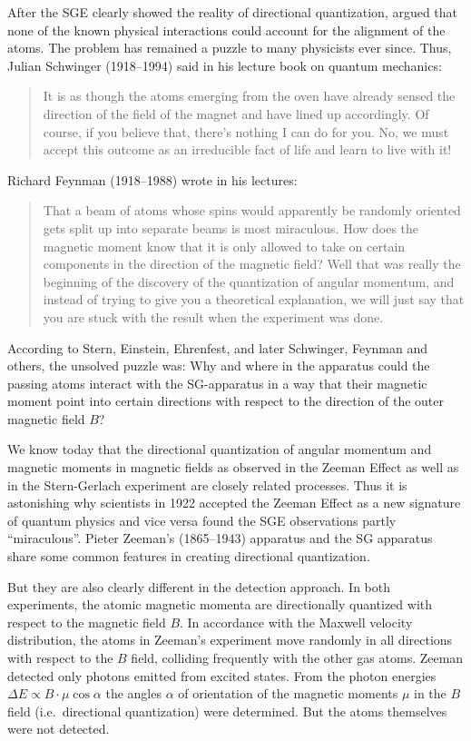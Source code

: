 \documentclass[12pt]{article}
\begin{document}
After the SGE clearly showed the reality of directional quantization, \cite{EinsteinAEtAl1922Bemerkungen} argued that none of the known physical interactions could account for the alignment of the atoms. The problem has remained a puzzle to many physicists ever since. 
Thus, Julian Schwinger (1918--1994) said in his lecture book on quantum mechanics:
\begin{quote}
It is as though the atoms emerging from the oven have already sensed the direction of the field of the magnet and have lined up accordingly. Of course, if you believe that, there's nothing I can do for you. No, we must accept this outcome as an irreducible fact of life and learn to live with it! 
\cite[p.~30]{SchwingerJ2001Mechanics}
\end{quote}
Richard Feynman (1918--1988) wrote in his lectures: 
\begin{quote}
That a beam of atoms whose spins would apparently be randomly oriented gets split up into separate beams is most miraculous. How does the magnetic moment know that it is only allowed to take on certain components in the direction of the magnetic field? Well that was really the beginning of the discovery of the quantization of angular momentum, and instead of trying to give you a theoretical explanation, we will just say that you are stuck with the result when the experiment was done.  
\cite[Vol.II, 35-2]{FeynmanR1963Lectures}
\end{quote}
According to Stern, Einstein, Ehrenfest, and later Schwinger, Feynman and others, the unsolved puzzle was: Why and where in the apparatus could the passing atoms interact with the SG-apparatus in a way that their magnetic moment point into certain directions with respect to the direction of the outer magnetic field $B$?  

We know today that the directional quantization of angular momentum and magnetic moments in magnetic fields as observed in the Zeeman Effect \citep{ZeemanP1896Invloed,ZeemanP1897Influence} as well as in the Stern-Gerlach experiment are closely related processes. Thus it is astonishing why scientists in 1922 accepted the Zeeman Effect as a new signature of quantum physics and vice versa found the SGE observations partly ``miraculous''. Pieter Zeeman's (1865--1943) apparatus and the SG apparatus share some common features in creating directional quantization. 

But they are also clearly different in the detection approach. In both experiments, the atomic magnetic momenta are directionally quantized with respect to the magnetic field $B$. In accordance with the Maxwell velocity distribution, the atoms in Zeeman's experiment move randomly in all directions with respect to the $B$ field, colliding frequently with the other gas atoms. Zeeman detected only photons emitted from excited states. From the photon energies $\Delta E \propto B\cdot \mu\cos\alpha$ the angles $\alpha$ of orientation of the magnetic moments $\mu$ in the $B$ field (i.e.\ directional quantization) were determined. But the atoms themselves were not detected. 
\end{document}
